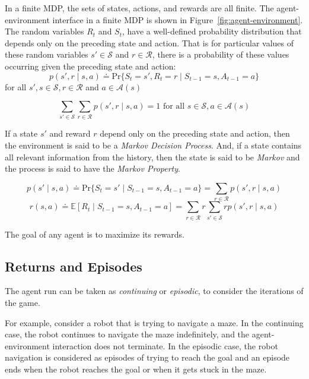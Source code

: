 In a finite MDP, the sets of states, actions, and rewards are all finite. The agent-environment interface in a finite MDP is shown in Figure~\ref{fig:agent-environment}. The random variables $R_t$ and $S_t$, have a well-defined probability distribution that depends only on the preceding state and action. That is for particular values of these random variables $s'\in\mathcal{S}$ and $r\in\mathcal{R}$, there is a probability of these values occurring given the preceding state and action:\begin{equation}
    p(s',r \mid s,a) \doteq \text{Pr}\{S_t=s', R_t=r \mid S_{t-1}=s, A_{t-1}=a\}
\end{equation}for all $s',s\in\mathcal{S}, r\in\mathcal{R}$ and $a\in\mathcal{A}(s)$

\begin{equation}
    \sum_{s'\in\mathcal{S}}\sum_{r\in\mathcal{R}}p(s',r \mid s,a) = 1 \text{ for all } s\in\mathcal{S}, a\in\mathcal{A}(s)
\end{equation}

If a state $s'$ and reward $r$ depend only on the preceding state and action, then the environment is said to be a \textit{Markov Decision Process}. And, if a state contains all relevant information from the history, then the state is said to be \textit{Markov} and the process is said to have the \textit{Markov Property}.

\begin{equation}
    p(s' \mid s,a) \doteq \text{Pr}\{S_t=s' \mid S_{t-1}=s, A_{t-1}=a\} = \sum_{r\in\mathcal{R}}p(s',r \mid s,a)
\end{equation}
\begin{equation}
    r(s,a) \doteq \mathbb{E}[R_t \mid S_{t-1}=s, A_{t-1}=a] = \sum_{r\in\mathcal{R}}r\sum_{s'\in\mathcal{S}}rp(s',r \mid s,a)
\end{equation}

The goal of any agent is to maximize its rewards.

\subsection{Returns and Episodes}

The agent run can be taken as \textit{continuing} or \textit{episodic}, to consider the iterations of the game.

For example, consider a robot that is trying to navigate a maze. In the continuing case, the robot continues to navigate the maze indefinitely, and the agent-environment interaction does not terminate. In the episodic case, the robot navigation is considered as episodes of trying to reach the goal and an episode ends when the robot reaches the goal or when it gets stuck in the maze.

